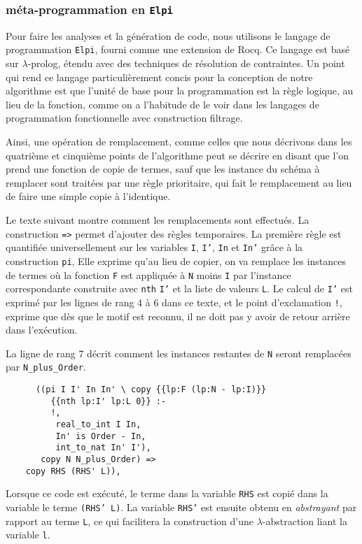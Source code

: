 \documentclass[draft]{jflart}
\begin{document}
\subsubsection{méta-programmation en \texttt{Elpi}}
Pour faire les analyses et la génération de code,
nous utilisons le langage de programmation
\texttt{Elpi}, fourni comme une extension de Rocq.  Ce langage est basé
sur \(\lambda\)-prolog, étendu avec des techniques de résolution de
contraintes.  Un point qui rend ce langage particulièrement concis
pour la conception de notre algorithme est que l'unité de base pour la
programmation est la règle logique, au lieu de la fonction, comme on a
l'habitude de le voir dans les langages de programmation fonctionnelle
avec construction filtrage.

Ainsi, une opération de remplacement, comme celles que nous décrivons
dans les quatrième et cinquième points de l'algorithme peut se décrire
en disant que l'on prend une fonction de copie de termes, sauf que les
instance du schéma à remplacer sont traitées par une règle prioritaire,
qui fait le remplacement au lieu de faire une simple copie à
l'identique.

Le texte suivant montre comment les remplacements sont effectués.  La
construction \texttt{=>} permet d'ajouter des règles temporaires.
La première règle est quantifiée universellement sur les variables
\texttt{I}, \texttt{I'}, \texttt{In} et \texttt{In'} grâce à la construction \texttt{pi},
Elle exprime qu'au lieu de copier, on va remplace les instances de termes
où la fonction \texttt{F} est
appliquée à \texttt{N} moins \texttt{I} par l'instance
correspondante construite avec \texttt{nth} \texttt{I'} et la liste de
valeurs
\texttt{L}.  Le calcul de \texttt{I'} est exprimé par les lignes de rang 4 à 6 dans
ce texte, et le point d'exclamation \texttt{!}, exprime que dès que le
motif est reconnu, il ne doit pas y avoir de retour arrière dans l'exécution.

La ligne de rang 7 décrit comment les instances restantes de \texttt{N} seront
remplacées par \texttt{N\_plus\_Order}.
\begin{verbatim}
      ((pi I I' In In' \ copy {{lp:F (lp:N - lp:I)}}
         {{nth lp:I' lp:L 0}} :-
         !,
          real_to_int I In,
          In' is Order - In,
          int_to_nat In' I'),
       copy N N_plus_Order) =>
    copy RHS (RHS' L)),
\end{verbatim}
Lorsque ce code est exécuté, le terme dans la variable \texttt{RHS} est copié
dans la variable le terme \texttt{(RHS' L)}.  La variable \texttt{RHS'} est ensuite
obtenu en {\em abstrayant} par rapport au terme \texttt{L}, ce qui facilitera
la construction d'une \(\lambda\)-abstraction liant la variable \texttt{l}.
\end{document}
